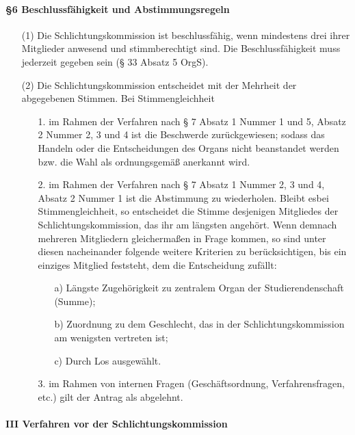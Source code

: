         \paragraph{§6 Beschlussfähigkeit und Abstimmungsregeln}
            \begin{itemize}
                \item[(1)] Die Schlichtungskommission ist beschlussfähig, wenn mindestens drei ihrer Mitglieder anwesend und stimmberechtigt sind. Die Beschlussfähigkeit muss jederzeit gegeben sein (§ 33 Absatz 5 OrgS).
                \item[(2)] Die Schlichtungskommission entscheidet mit der Mehrheit der abgegebenen Stimmen. Bei Stimmengleichheit
                    \begin{itemize}
                        \item[1.] im Rahmen der Verfahren nach § 7 Absatz 1 Nummer 1 und 5, Absatz 2 Nummer 2, 3 und 4 ist die Beschwerde zurückgewiesen; sodass das Handeln oder die Entscheidungen des Organs nicht beanstandet werden bzw. die Wahl als ordnungsgemäß anerkannt wird.
                        \item[2.] im Rahmen der Verfahren nach § 7 Absatz 1 Nummer 2, 3 und 4, Absatz 2 Nummer 1 ist die Abstimmung zu wiederholen. Bleibt esbei Stimmengleichheit, so entscheidet die Stimme desjenigen Mitgliedes der Schlichtungskommission, das ihr am längsten angehört. Wenn demnach mehreren Mitgliedern gleichermaßen in Frage kommen, so sind unter diesen nacheinander folgende weitere Kriterien zu berücksichtigen, bis ein einziges Mitglied feststeht, dem die Entscheidung zufällt:
                            \begin{itemize}
                                \item[a)] Längste Zugehörigkeit zu zentralem Organ der Studierendenschaft (Summe);
                                \item[b)] Zuordnung zu dem Geschlecht, das in der Schlichtungskommission am wenigsten vertreten ist;
                                \item[c)] Durch Los ausgewählt.
                            \end{itemize}
                        \item[3.] im Rahmen von internen Fragen (Geschäftsordnung, Verfahrensfragen, etc.) gilt der Antrag als abgelehnt.
                    \end{itemize}
            \end{itemize}
    \paragraph{III Verfahren vor der Schlichtungskommission}
